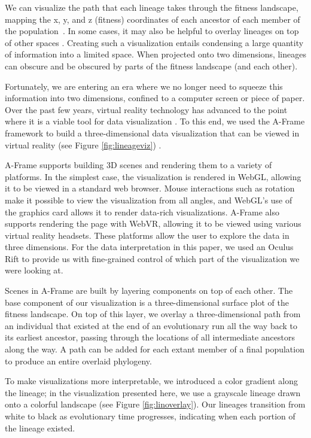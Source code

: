 \documentclass[letterpaper]{article}
\begin{document}
We can visualize the path that each lineage takes through the fitness landscape, mapping the x, y, and z (fitness) coordinates of each ancestor of each member of the population~\citep{virgo_lineage_2017}. In some cases, it may also be helpful to overlay lineages on top of other spaces \citep{dolson_spatial_2017-1, mouret_illuminating_2015}. Creating such a visualization entails condensing a large quantity of information into a limited space. When projected onto two dimensions, lineages can obscure and be obscured by parts of the fitness landscape (and each other). 

Fortunately, we are entering an era where we no longer need to squeeze this information into two dimensions, confined to a computer screen or piece of paper. Over the past few years, virtual reality technology has advanced to the point where it is a viable tool for data visualization \citep{van_dam_experiments_2002,olshannikova_visualizing_2015}. To this end, we used the A-Frame framework \citep{aframe} to build a three-dimensional data visualization that can be viewed in virtual reality (see Figure \ref{fig:lineageviz}) \citep{dolson_visualizing_2018}.

A-Frame supports building 3D scenes and rendering them to a variety of platforms. In the simplest case, the visualization is rendered in WebGL, allowing it to be viewed in a standard web browser. Mouse interactions such as rotation make it possible to view the visualization from all angles, and WebGL's use of the graphics card allows it to render data-rich visualizations. A-Frame also supports rendering the page with WebVR, allowing it to be viewed using various virtual reality headsets. These platforms allow the user to explore the data in three dimensions. For the data interpretation in this paper, we used an Oculus Rift to provide us with fine-grained control of which part of the visualization we were looking at. 

Scenes in A-Frame are built by layering components on top of each other. The base component of our visualization is a three-dimensional surface plot of the fitness landscape. On top of this layer, we overlay a three-dimensional path from an individual that existed at the end of an evolutionary run all the way back to its earliest ancestor, passing through the locations of all intermediate ancestors along the way. A path can be added for each extant member of a final population to produce an entire overlaid phylogeny.

To make visualizations more interpretable, we introduced a color gradient along the lineage; in the visualization presented here, we use a grayscale lineage drawn onto a colorful landscape (see Figure \ref{fig:linoverlay}).  Our lineages transition from white to black as evolutionary time progresses, indicating when each portion of the lineage existed.
\end{document}
